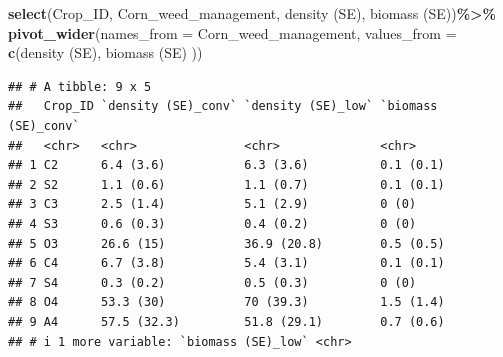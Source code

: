 \documentclass[
]{article}
\newenvironment{Shaded}{\begin{snugshade}}{\end{snugshade}}
\newcommand{\AttributeTok}[1]{\textcolor[rgb]{0.13,0.29,0.53}{#1}}
\newcommand{\FunctionTok}[1]{\textcolor[rgb]{0.13,0.29,0.53}{\textbf{#1}}}
\newcommand{\NormalTok}[1]{#1}
\newcommand{\SpecialCharTok}[1]{\textcolor[rgb]{0.81,0.36,0.00}{\textbf{#1}}}
\newcommand{\StringTok}[1]{\textcolor[rgb]{0.31,0.60,0.02}{#1}}
\begin{document}
\begin{Shaded}
\begin{Highlighting}[]
  \FunctionTok{select}\NormalTok{(Crop\_ID, Corn\_weed\_management, }\StringTok{\textasciigrave{}}\AttributeTok{density (SE)}\StringTok{\textasciigrave{}}\NormalTok{,  }\StringTok{\textasciigrave{}}\AttributeTok{biomass (SE)}\StringTok{\textasciigrave{}}\NormalTok{)}\SpecialCharTok{\%\textgreater{}\%}
  \FunctionTok{pivot\_wider}\NormalTok{(}\AttributeTok{names\_from =}\NormalTok{ Corn\_weed\_management,}
              \AttributeTok{values\_from =} \FunctionTok{c}\NormalTok{(}\StringTok{\textasciigrave{}}\AttributeTok{density (SE)}\StringTok{\textasciigrave{}}\NormalTok{,  }\StringTok{\textasciigrave{}}\AttributeTok{biomass (SE)}\StringTok{\textasciigrave{}}\NormalTok{ ))}
\end{Highlighting}
\end{Shaded}

\begin{verbatim}
## # A tibble: 9 x 5
##   Crop_ID `density (SE)_conv` `density (SE)_low` `biomass (SE)_conv`
##   <chr>   <chr>               <chr>              <chr>              
## 1 C2      6.4 (3.6)           6.3 (3.6)          0.1 (0.1)          
## 2 S2      1.1 (0.6)           1.1 (0.7)          0.1 (0.1)          
## 3 C3      2.5 (1.4)           5.1 (2.9)          0 (0)              
## 4 S3      0.6 (0.3)           0.4 (0.2)          0 (0)              
## 5 O3      26.6 (15)           36.9 (20.8)        0.5 (0.5)          
## 6 C4      6.7 (3.8)           5.4 (3.1)          0.1 (0.1)          
## 7 S4      0.3 (0.2)           0.5 (0.3)          0 (0)              
## 8 O4      53.3 (30)           70 (39.3)          1.5 (1.4)          
## 9 A4      57.5 (32.3)         51.8 (29.1)        0.7 (0.6)          
## # i 1 more variable: `biomass (SE)_low` <chr>
\end{verbatim}
\end{document}
